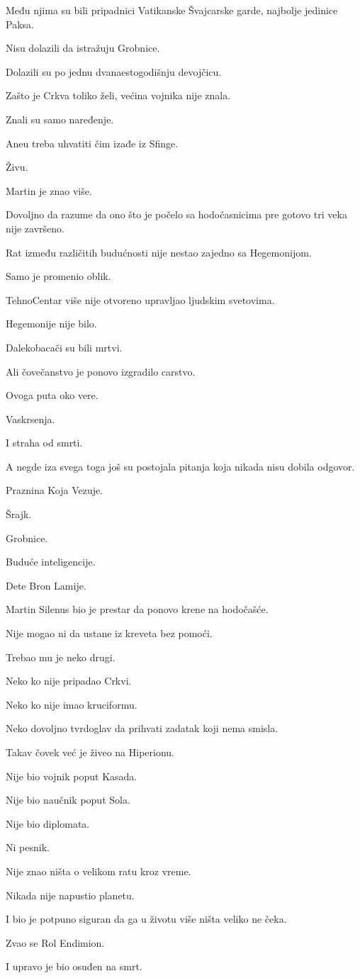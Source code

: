 Među njima su bili pripadnici Vatikanske Švajcarske garde, najbolje jedinice Paksa.

Nisu dolazili da istražuju Grobnice.

Dolazili su po jednu dvanaestogodišnju devojčicu.

\bigskip

Zašto je Crkva toliko želi, većina vojnika nije znala.

Znali su samo naređenje.

Aneu treba uhvatiti čim izađe iz Sfinge.

Živu.

\bigskip

Martin je znao više.

Dovoljno da razume da ono što je počelo sa hodočasnicima pre gotovo tri veka nije završeno.

Rat između različitih budućnosti nije nestao zajedno sa Hegemonijom.

Samo je promenio oblik.

\bigskip

TehnoCentar više nije otvoreno upravljao ljudskim svetovima.

Hegemonije nije bilo.

Dalekobacači su bili mrtvi.

Ali čovečanstvo je ponovo izgradilo carstvo.

Ovoga puta oko vere.

Vaskrsenja.

I straha od smrti.

\bigskip

A negde iza svega toga još su postojala pitanja koja nikada nisu dobila odgovor.

Praznina Koja Vezuje.

Šrajk.

Grobnice.

Buduće inteligencije.

Dete Bron Lamije.

\bigskip

Martin Silenus bio je prestar da ponovo krene na hodočašće.

Nije mogao ni da ustane iz kreveta bez pomoći.

Trebao mu je neko drugi.

Neko ko nije pripadao Crkvi.

Neko ko nije imao kruciformu.

Neko dovoljno tvrdoglav da prihvati zadatak koji nema smisla.

\bigskip

Takav čovek već je živeo na Hiperionu.

Nije bio vojnik poput Kasada.

Nije bio naučnik poput Sola.

Nije bio diplomata.

Ni pesnik.

Nije znao ništa o velikom ratu kroz vreme.

Nikada nije napustio planetu.

I bio je potpuno siguran da ga u životu više ništa veliko ne čeka.

\bigskip

Zvao se Rol Endimion.

I upravo je bio osuđen na smrt.